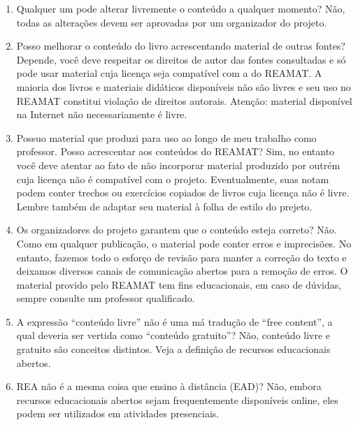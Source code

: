 \documentclass[12pt]{report}
\begin{document}
\begin{enumerate}
\item Qualquer um pode alterar livremente o conteúdo a qualquer momento?
Não, todas as alterações devem ser aprovadas por um organizador do projeto.

\item Posso melhorar o conteúdo do livro acrescentando material de outras fontes?
Depende, você deve respeitar os direitos de autor das fontes consultadas e só pode usar material cuja licença seja compatível com a do REAMAT. A maioria dos livros e materiais didáticos disponíveis não são livres e seu uso no REAMAT constitui violação de direitos autorais. Atenção: material disponível na Internet não necessariamente é livre.

\item Possuo material que produzi para uso ao longo de meu trabalho como professor. Posso acrescentar aos conteúdos do REAMAT?
Sim, no entanto você deve atentar ao fato de não incorporar material produzido por outrém cuja licença não é compatível com o projeto. Eventualmente, suas notam podem conter trechos ou exercícios copiados de livros cuja licença não é livre. Lembre também de adaptar seu material à folha de estilo do prejeto.

\item Os organizadores do projeto garantem que o conteúdo esteja correto?
Não. Como em qualquer publicação, o material pode conter erros e imprecisões. No entanto, fazemos todo o esforço de revisão para manter a correção do texto e deixamos diversos canais de comunicação abertos para a remoção de erros. O material provido pelo REAMAT tem fins educacionais, em caso de dúvidas, sempre consulte um professor qualificado.

\item A expressão ``conteúdo livre'' não é uma má tradução de ``free content'', a qual deveria ser vertida como ``conteúdo gratuito''?
Não, conteúdo livre e gratuito são conceitos distintos. Veja a definição de recursos educacionais abertos.

\item REA não é a mesma coisa que ensino à distância (EAD)?
Não, embora recursos educacionais abertos sejam frequentemente disponíveis online, eles podem ser utilizados em atividades presenciais.
\end{enumerate}
\end{document}
